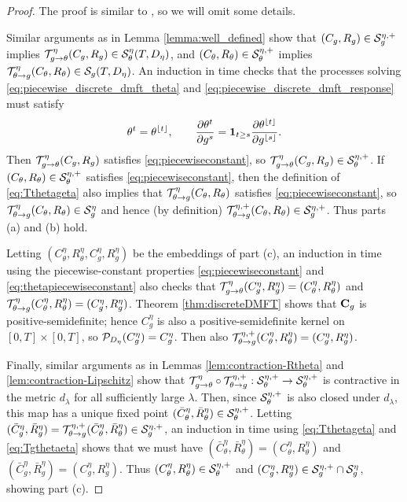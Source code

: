 \begin{proof}
The proof is similar to \cite[Lemma 4.3]{fan2025dynamicalI}, so we will omit
some details.

Similar arguments as in Lemma \ref{lemma:well_defined}
show that $(C_g,R_g) \in \mathcal{S}_g^{\eta,+}$
implies $\mathcal{T}_{g \to \theta}^\eta(C_g,R_g) \in \mathcal{S}_\theta^\eta(T,D_\eta)$,
and $(C_\theta,R_\theta) \in \mathcal{S}_\theta^{\eta,+}$ implies
$\mathcal{T}_{\theta \to g}^\eta(C_\theta,R_\theta) \in \mathcal{S}_g(T,D_\eta)$. 
An induction in time checks that the processes solving
\eqref{eq:piecewise_discrete_dmft_theta}
and \eqref{eq:piecewise_discrete_dmft_response} must satisfy
\begin{equation}\label{eq:thetapiecewiseconstant}
\theta^t=\theta^{\lfloor t \rfloor},
\qquad \frac{\partial \theta^t}{\partial g^s}
=\mathbf{1}_{t \geq s}\frac{\partial \theta^{\lfloor t \rfloor}}{\partial g^{\lfloor s
\rfloor}}.
\end{equation}
Then $\mathcal{T}_{g \to \theta}^\eta(C_g,R_g)$ satisfies \eqref{eq:piecewiseconstant},
so $\mathcal{T}_{g \to \theta}^\eta(C_g,R_g)
\in \mathcal{S}_\theta^{\eta,+}$. If $(C_\theta,R_\theta) \in \mathcal{S}_\theta^{\eta,+}$
satisfies \eqref{eq:piecewiseconstant}, then the definition of
\eqref{eq:Tthetageta} also implies that
$\mathcal{T}_{\theta \to g}^\eta(C_\theta,R_\theta)$ satisfies
\eqref{eq:piecewiseconstant}, so
$\mathcal{T}_{\theta \to g}^\eta(C_\theta,R_\theta) \in \mathcal{S}_g^\eta$
and hence (by definition) $\mathcal{T}_{\theta \to g}^{\eta,+}(C_\theta,R_\theta) \in \mathcal{S}_g^{\eta,+}$.
Thus parts (a) and (b) hold.

Letting $(C_\theta^\eta,R_\theta^\eta,C_g^\eta,R_g^\eta)$ be the embeddings of part (c),
an induction in time using the piecewise-constant properties
\eqref{eq:piecewiseconstant} and
\eqref{eq:thetapiecewiseconstant} also checks that
$\mathcal{T}_{g \to \theta}^\eta(C_g^\eta,R_g^\eta)=(C_\theta^\eta,R_\theta^\eta)$
and $\mathcal{T}_{\theta \to g}^\eta(C_\theta^\eta,R_\theta^\eta)=(C_g^\eta,R_g^\eta)$.
Theorem \ref{thm:discreteDMFT} shows that $\mathbf{C}_g$ is
positive-semidefinite; hence $C_g^\eta$ is also a
positive-semidefinite kernel on $[0,T] \times [0,T]$, so
$\mathcal{P}_{D_\eta}(C_g^\eta)=C_g^\eta$. Then also
$\mathcal{T}_{\theta \to g}^{\eta,+}(C_\theta^\eta,R_\theta^\eta)=(C_g^\eta,R_g^\eta)$.

Finally, similar arguments as in Lemmas \ref{lem:contraction-Rtheta}
and \ref{lem:contraction-Lipschitz} show that
$\mathcal{T}_{g \to \theta}^\eta \circ \mathcal{T}_{\theta \to g}^{\eta,+}:\mathcal{S}_\theta^{\eta,+} \to \mathcal{S}_\theta^{\eta,+}$ is contractive in
the metric $d_\lambda$ for all sufficiently large $\lambda$. Then, since
$\mathcal{S}_\theta^{\eta,+}$ is also closed under $d_\lambda$,
this map has a unique fixed point $(\bar C_\theta^\eta,\bar R_\theta^\eta) \in
\mathcal{S}_\theta^{\eta,+}$. Letting $(\bar C_g^\eta,\bar R_g^\eta)=
\mathcal{T}_{\theta \to g}^{\eta,+}(\bar C_\theta^\eta,\bar R_\theta^\eta)
\in \mathcal{S}_g^{\eta,+}$, an induction in time using \eqref{eq:Tthetageta} and
\eqref{eq:Tgthetaeta} shows that we must have
$(\bar C_\theta^\eta,\bar R_\theta^\eta)=(C_\theta^\eta,R_\theta^\eta)$
and $(\bar C_g^\eta,\bar R_g^\eta)=(C_g^\eta,R_g^\eta)$. Thus 
$(C_\theta^\eta,R_\theta^\eta) \in \mathcal{S}_\theta^{\eta,+}$ and
$(C_g^\eta,R_g^\eta)\in \mathcal{S}_g^{\eta,+} \cap \mathcal{S}_g^{\eta}$,
showing part (c).
\end{proof}

